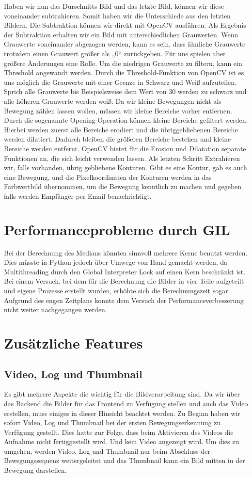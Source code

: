 Haben wir nun das Durschnitts-Bild und das letzte Bild, können wir diese voneinander subtrahieren. Somit haben wir die Unterschiede aus den letzten Bildern. Die Subtraktion können wir direkt mit OpenCV ausführen.
Als Ergebnis der Subtraktion erhalten wir ein Bild mit unterschiedlichen Grauwerten. Wenn Grauwerte voneinander abgezogen werden, kann es sein, dass ähnliche Grauwerte trotzdem einen Grauwert größer als „0“ zurückgeben. Für uns spielen aber größere Änderungen eine Rolle. Um die niedrigen Grauwerte zu filtern, kann ein Threshold angewandt werden. Durch die Threshold-Funktion von OpenCV ist es uns möglich die Grauwerte mit einer Grenze in Schwarz und Weiß aufzuteilen.  Sprich alle Grauwerte  bis Beispielsweise dem Wert von 30 werden zu schwarz und alle höheren Grauwerte werden weiß.
Da wir kleine Bewegungen nicht als Bewegung zählen lassen wollen, müssen wir kleine Bereiche vorher entfernen. Durch die sogenannte Opening-Operation können kleine Bereiche gefiltert werden. Hierbei werden zuerst alle Bereiche erodiert und die übriggebliebenen Bereiche werden dilatiert. Dadurch bleiben die größeren Bereiche bestehen und kleine Bereiche werden entfernt. OpenCV bietet für die Erosion und Dilatation separate Funktionen an, die sich leicht verwenden lassen.
Als letzten Schritt Extrahieren wir, falls vorhanden, übrig gebliebene Konturen. Gibt es eine Kontur, gab es auch eine Bewegung, und die Pixelkoordinaten der Konturen werden in das Farbwertbild übernommen, um die Bewegung kenntlich zu machen und gegeben falls werden Empfänger per Email benachrichtigt.
\section{Performanceprobleme durch GIL}
Bei der Berechnung des Medians könnten sinnvoll mehrere Kerne benutzt werden. Dies müsste in Python jedoch über Umwege von Hand gemacht werden, da Multithreading durch den Global Interpreter Lock auf einen Kern beschränkt ist. Bei einem Versuch, bei dem für die Berechnung die Bilder in vier Teile aufgeteilt und eigene Prozesse erstellt wurden, erhöhte sich die Berechnungszeit sogar. Aufgrund des engen Zeitplans konnte dem Versuch der Performanceverbesserung nicht weiter nachgegangen werden.
\section{Zusätzliche Features}
\subsection{Video, Log und Thumbnail}
Es gibt mehrere Aspekte die wichtig für die Bildverarbeitung sind. Da wir über das Backend die Bilder für das Frontend zu Verfügung stellen und auch das Video erstellen, muss einiges in dieser Hinsicht beachtet werden. Zu Beginn haben wir sofort Video, Log und Thumbnail bei der ersten Bewegungserkennung zu Verfügung gestellt. Dies hatte zur Folge, dass beim Aktivieren des Videos die Aufnahme nicht fertiggestellt wird. Und kein Video angezeigt wird. Um dies zu umgehen, werden Video, Log und Thumbnail nur beim Abschluss der Bewegungssequenz weitergeleitet und das Thumbnail kann ein Bild mitten in der Bewegung darstellen.

